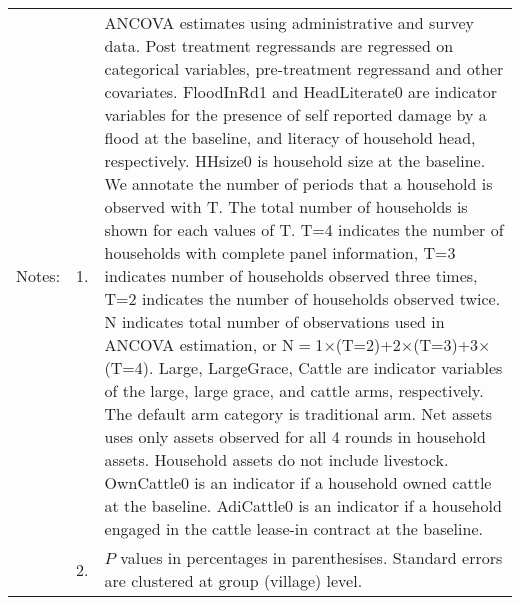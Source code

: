 \begin{minipage}[t]{14cm}
\begin{tabular}{>{\hfill\scriptsize}p{1cm}<{}>{\hfill\scriptsize}p{.25cm}<{}>{\scriptsize}p{12cm}<{\hfill}}
Notes: & 1. & ANCOVA estimates using administrative and survey data. Post treatment regressands are regressed on categorical variables, pre-treatment regressand and other covariates. \textsf{FloodInRd1} and \textsf{HeadLiterate0} are indicator variables for the presence of self reported damage by a flood at the baseline, and literacy of household head, respectively. \textsf{HHsize0} is household size at the baseline. We annotate the number of periods that a household is observed with \textsf{T}. The total number of households is shown for each values of \textsf{T}. \textsf{T=4} indicates the number of households with complete panel information, \textsf{T=3} indicates number of households observed three times, \textsf{T=2} indicates the number of households observed twice. \textsf{N} indicates total number of observations used in ANCOVA estimation, or \textsf{N$=$1$\times$(T=2)+2$\times$(T=3)+3$\times$(T=4)}.  \textsf{Large}, \textsf{LargeGrace}, \textsf{Cattle} are indicator variables of the \textsf{large}, \textsf{large grace}, and \textsf{cattle} arms, respectively. The default arm category is \textsf{traditional} arm. Net assets uses only assets observed for all 4 rounds in household assets. Household assets do not include livestock. \textsf{OwnCattle0} is an indicator if a household owned cattle at the baseline. \textsf{AdiCattle0} is an indicator if a household engaged in the cattle lease-in contract at the baseline.  \\
& 2. & $P$ values in percentages in parenthesises. Standard errors are clustered at group (village) level.
\end{tabular}
\end{minipage}

